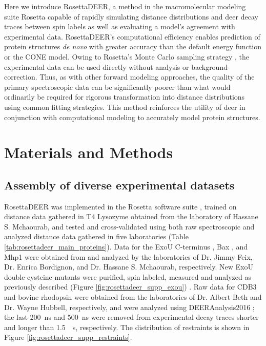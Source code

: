 Here we introduce RosettaDEER, a method in the macromolecular modeling suite Rosetta capable of rapidly simulating distance distributions and \gls{deer} decay traces between spin labels as well as evaluating a model’s agreement with experimental data. RosettaDEER’s computational efficiency enables prediction of protein structures \emph{de novo} with greater accuracy than the default energy function or the CONE model. Owing to Rosetta’s Monte Carlo sampling strategy \citep*{Leaver-fay2011}, the experimental data can be used directly without analysis or background-correction. Thus, as with other forward modeling approaches\citep*{Stein2015}, the quality of the primary spectroscopic data can be significantly poorer than what would ordinarily be required for rigorous transformation into distance distributions using common fitting strategies. This method reinforces the utility of \gls{deer} in conjunction with computational modeling to accurately model protein structures.

\section{Materials and Methods}\label{sec:rosettadeer_methods}

\subsection{Assembly of diverse experimental datasets}

RosettaDEER was implemented in the Rosetta software suite \citep*{Leaver-fay2011, Leman2020}, trained on distance data gathered in T4 Lysozyme obtained from the laboratory of Hassane S. Mchaourab, and tested and cross-validated using both raw spectroscopic and analyzed distance data gathered in five laboratories (Table \ref{tab:rosettadeer_main_proteins}). Data for the ExoU C-terminus \citep*{Fischer2017}, Bax \citep*{Bleicken2014}, and Mhp1 \citep*{Kazmier2014a} were obtained from and analyzed by the laboratories of Dr. Jimmy Feix, Dr. Enrica Bordignon, and Dr. Hassane S. Mchaourab, respectively. New ExoU double-cysteine mutants were purified, spin labeled, measured and analyzed as previously described (Figure \ref{fig:rosettadeer_supp_exou}) \citep*{Fischer2017}. Raw data for CDB3 \citep*{Zhou2005} and bovine rhodopsin \citep*{Altenbach2008} were obtained from the laboratories of Dr. Albert Beth and Dr. Wayne Hubbell, respectively, and were analyzed using DEERAnalysis2016 \citep*{Jeschke2006}; the last \SI{200}{ns} and \SI{500}{ns} were removed from experimental decay traces shorter and longer than \SI{1.5}{\upmu s}, respectively. The distribution of restraints is shown in Figure \ref{fig:rosettadeer_supp_restraints}.

